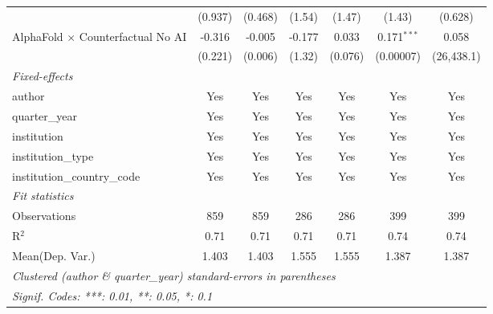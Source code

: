 \begin{tabular}{lcccccc}
                                            & (0.937)      & (0.468) & (1.54)  & (1.47)  & (1.43)        & (0.628)\\   
   AlphaFold $\times$ Counterfactual No AI  & -0.316       & -0.005  & -0.177  & 0.033   & 0.171$^{***}$ & 0.058\\   
                                            & (0.221)      & (0.006) & (1.32)  & (0.076) & (0.00007)     & (26,438.1)\\   
   \midrule
   \emph{Fixed-effects}\\
   author                                   & Yes          & Yes     & Yes     & Yes     & Yes           & Yes\\  
   quarter\_year                            & Yes          & Yes     & Yes     & Yes     & Yes           & Yes\\  
   institution                              & Yes          & Yes     & Yes     & Yes     & Yes           & Yes\\  
   institution\_type                        & Yes          & Yes     & Yes     & Yes     & Yes           & Yes\\  
   institution\_country\_code               & Yes          & Yes     & Yes     & Yes     & Yes           & Yes\\  
   \midrule
   \emph{Fit statistics}\\
   Observations                             & 859          & 859     & 286     & 286     & 399           & 399\\  
   R$^2$                                    & 0.71         & 0.71    & 0.71    & 0.71    & 0.74          & 0.74\\  
Mean(Dep. Var.) & 1.403 & 1.403 & 1.555 & 1.555 & 1.387 & 1.387 \\
   \midrule \midrule
   \multicolumn{7}{l}{\emph{Clustered (author \& quarter\_year) standard-errors in parentheses}}\\
   \multicolumn{7}{l}{\emph{Signif. Codes: ***: 0.01, **: 0.05, *: 0.1}}\\
\end{tabular}
\par\endgroup
